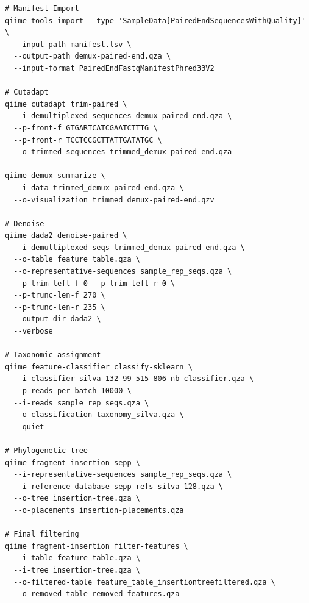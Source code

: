 \documentclass[
]{book}
\begin{document}
\begin{verbatim}
# Manifest Import
qiime tools import --type 'SampleData[PairedEndSequencesWithQuality]' \
  --input-path manifest.tsv \
  --output-path demux-paired-end.qza \
  --input-format PairedEndFastqManifestPhred33V2

# Cutadapt
qiime cutadapt trim-paired \
  --i-demultiplexed-sequences demux-paired-end.qza \
  --p-front-f GTGARTCATCGAATCTTTG \
  --p-front-r TCCTCCGCTTATTGATATGC \
  --o-trimmed-sequences trimmed_demux-paired-end.qza

qiime demux summarize \
  --i-data trimmed_demux-paired-end.qza \
  --o-visualization trimmed_demux-paired-end.qzv

# Denoise
qiime dada2 denoise-paired \
  --i-demultiplexed-seqs trimmed_demux-paired-end.qza \
  --o-table feature_table.qza \
  --o-representative-sequences sample_rep_seqs.qza \
  --p-trim-left-f 0 --p-trim-left-r 0 \
  --p-trunc-len-f 270 \
  --p-trunc-len-r 235 \
  --output-dir dada2 \
  --verbose

# Taxonomic assignment
qiime feature-classifier classify-sklearn \
  --i-classifier silva-132-99-515-806-nb-classifier.qza \
  --p-reads-per-batch 10000 \
  --i-reads sample_rep_seqs.qza \
  --o-classification taxonomy_silva.qza \
  --quiet

# Phylogenetic tree
qiime fragment-insertion sepp \
  --i-representative-sequences sample_rep_seqs.qza \
  --i-reference-database sepp-refs-silva-128.qza \
  --o-tree insertion-tree.qza \
  --o-placements insertion-placements.qza

# Final filtering
qiime fragment-insertion filter-features \
  --i-table feature_table.qza \
  --i-tree insertion-tree.qza \
  --o-filtered-table feature_table_insertiontreefiltered.qza \
  --o-removed-table removed_features.qza
\end{verbatim}
\end{document}
